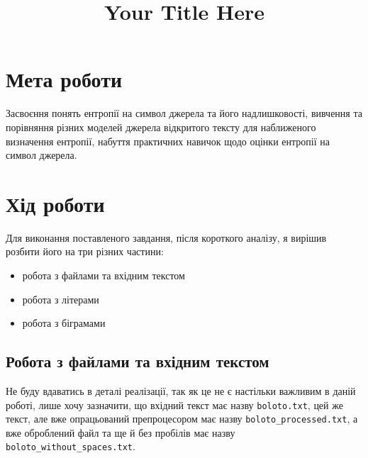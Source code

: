 \documentclass[12pt]{article}
\title{Your Title Here}
\author{}
\date{}
\begin{document}
\maketitle

\section{Мета роботи}
\quad Засвоєння понять ентропії на символ джерела та його надлишковості, вивчення та порівняння різних моделей джерела відкритого тексту для наближеного визначення ентропії, набуття практичних навичок щодо оцінки ентропії на символ джерела.

\section{Хід роботи}
\quad Для виконання поставленого завдання, після короткого аналізу, я вирішив розбити його на три різних частини: 
\begin{itemize}
    \item робота з файлами та вхідним текстом
    \item робота з літерами
    \item робота з біграмами
\end{itemize}

\subsection{Робота з файлами та вхідним текстом}
\quad Не буду вдаватись в деталі реалізації, так як це не є настільки важливим в даній роботі, лише хочу зазначити, що вхідний текст має назву \texttt{boloto.txt}, цей же текст, але вже опрацьований препроцесором має назву \texttt{boloto\_processed.txt}, а вже оброблений файл та ще й без пробілів має назву \texttt{boloto\_without\_spaces.txt}.
\end{document}
